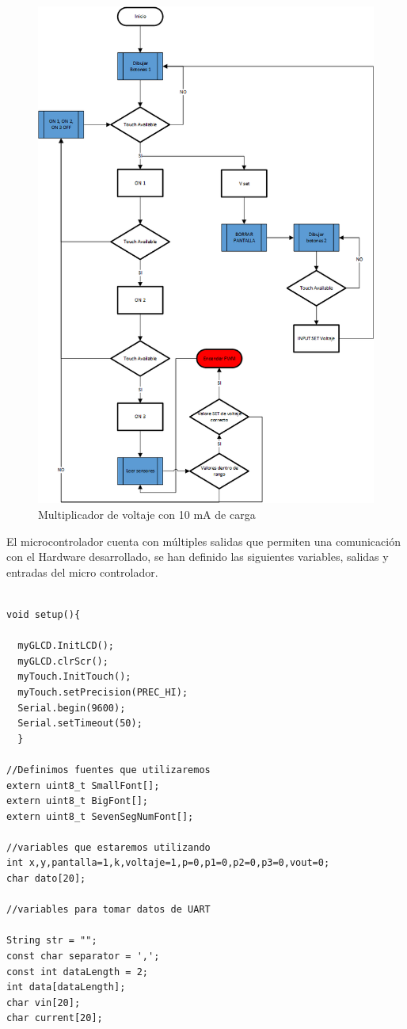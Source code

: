 \begin{figure}[H]
\centering
\includegraphics[width=12cm]{Capitulo3/figs/diagramafir.png}
\caption{Multiplicador de voltaje con 10 mA de carga}
\end{figure}


El microcontrolador cuenta con múltiples salidas que permiten una comunicación con el Hardware desarrollado, se han definido las siguientes variables, salidas y entradas del micro controlador.

\begin{verbatim}

void setup(){

  myGLCD.InitLCD();
  myGLCD.clrScr();
  myTouch.InitTouch();
  myTouch.setPrecision(PREC_HI);
  Serial.begin(9600);
  Serial.setTimeout(50);
  }

//Definimos fuentes que utilizaremos
extern uint8_t SmallFont[];
extern uint8_t BigFont[];
extern uint8_t SevenSegNumFont[];

//variables que estaremos utilizando
int x,y,pantalla=1,k,voltaje=1,p=0,p1=0,p2=0,p3=0,vout=0;
char dato[20];

//variables para tomar datos de UART

String str = "";
const char separator = ',';
const int dataLength = 2;
int data[dataLength];
char vin[20];
char current[20];

\end{verbatim}

